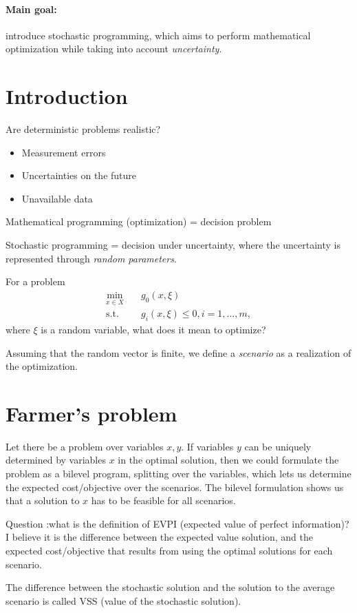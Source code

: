 
\paragraph{Main goal:} introduce stochastic programming, which aims to perform mathematical optimization while taking into account \emph{uncertainty}.

\section*{Introduction}

Are deterministic problems realistic?
\begin{itemize}
    \item Measurement errors
    \item Uncertainties on the future
    \item Unavailable data
\end{itemize}

Mathematical programming (optimization) = decision problem

Stochastic programming = decision under uncertainty, where the uncertainty is represented through \emph{random parameters}.

For a problem
\begin{align*}
    \min_{x\in X} \quad & g_0(x,\xi) \\
    \textrm{s.t.} \quad & g_i(x,\xi) \le 0, i=1,\ldots,m 
,\end{align*}
where $\xi$ is a random variable, what does it mean to optimize?

Assuming that the random vector is finite, we define a \emph{scenario} as a realization of the optimization.

\section*{Farmer's problem}

Let there be a problem over variables $x,y$.
If variables $y$ can be uniquely determined by variables $x$ in the optimal solution, then we could formulate the problem as a bilevel program, splitting over the variables, which lets us determine the expected cost/objective over the scenarios.
The bilevel formulation shows us that a solution to $x$ has to be feasible for all scenarios.

Question :what is the definition of EVPI (expected value of perfect information)? I believe it is the difference between the expected value solution, and the expected cost/objective that results from using the optimal solutions for each scenario.

The difference between the stochastic solution and the solution to the average scenario is called VSS (value of the stochastic solution).

